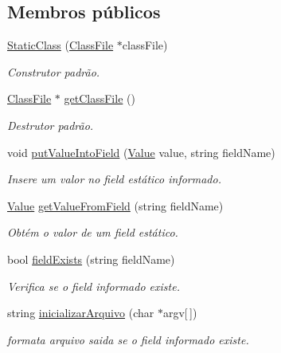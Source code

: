 \subsection*{Membros públicos}
\begin{DoxyCompactItemize}
\item 
\hyperlink{classStaticClass_a6c0e4d8842888a97160f1e815c8e6ac3}{Static\+Class} (\hyperlink{classClassFile}{Class\+File} $\ast$class\+File)
\begin{DoxyCompactList}\small\item\em Construtor padrão. \end{DoxyCompactList}\item 
\hyperlink{classClassFile}{Class\+File} $\ast$ \hyperlink{classStaticClass_ae00772669e7a0e54980ed303ff933cef}{get\+Class\+File} ()
\begin{DoxyCompactList}\small\item\em Destrutor padrão. \end{DoxyCompactList}\item 
void \hyperlink{classStaticClass_a010cf8cd301416ef4408c066e0fbcda6}{put\+Value\+Into\+Field} (\hyperlink{structValue}{Value} value, string field\+Name)
\begin{DoxyCompactList}\small\item\em Insere um valor no field estático informado. \end{DoxyCompactList}\item 
\hyperlink{structValue}{Value} \hyperlink{classStaticClass_a24545b54a3e3b6ae17dc8cd04004c883}{get\+Value\+From\+Field} (string field\+Name)
\begin{DoxyCompactList}\small\item\em Obtém o valor de um field estático. \end{DoxyCompactList}\item 
bool \hyperlink{classStaticClass_a4d2f7ca3157461323a6e471328ed7092}{field\+Exists} (string field\+Name)
\begin{DoxyCompactList}\small\item\em Verifica se o field informado existe. \end{DoxyCompactList}\item 
string \hyperlink{classStaticClass_a6acf891b8d9119fddeec52169b364d66}{inicializar\+Arquivo} (char $\ast$argv\mbox{[}$\,$\mbox{]})
\begin{DoxyCompactList}\small\item\em formata arquivo saida se o field informado existe. \end{DoxyCompactList}\end{DoxyCompactItemize}
